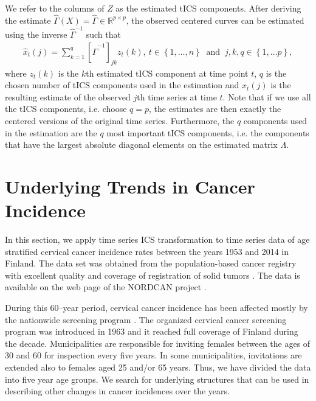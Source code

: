 \documentclass{llncs}
\begin{document}
We refer to the columns of $Z$ as the estimated tICS components. After deriving the estimate $\hat{\Gamma}\left(X\right) = \hat{\Gamma}\in \mathbb{R}^{p\times p}$,  the observed centered curves can be  estimated using the inverse $\hat{\Gamma}^{-1}$ such that
\begin{align}
\label{estimation}
\hat{x}_t\left(j\right)= \sum_{k=1}^q  \left[\hat{\Gamma}^{-1}\right]_{jk} z_t\left(k\right) , \ t\in \left\{1,\ldots, n\right\}  \ \text{ and  } \ j,k,q \in \left\{1,\ldots p\right\},
\end{align}
where $z_t\left(k\right)$ is the $k$th estimated tICS component at time point $t$, $q$ is the chosen number of tICS components used in the estimation and $\hat{x}_t\left(j\right)$ is the resulting estimate of the observed $j$th time series at  time $t$.  Note that if we use all the tICS components, i.e. choose $q=p$, the estimates are then exactly the centered versions of the original time series. Furthermore, the $q$ components used in the estimation are the $q$ most important tICS components, i.e. the components that have the   largest absolute  diagonal elements on the estimated  matrix $\Lambda$. 


\section{Underlying Trends in Cancer Incidence}\label{data}
In this section, we apply time series ICS transformation to time series data of age stratified cervical cancer incidence rates between the years 1953 and 2014 in Finland.
The data set was obtained from the population-based cancer registry with excellent quality and coverage of registration of solid tumors \cite{leinonen2016,teppo1994}. The data is available on  the web page of the NORDCAN project \cite{engholm2010}.

During this 60--year period, cervical cancer incidence has been affected mostly by the nationwide screening program \cite{hakama1975}. The organized cervical cancer screening program was introduced in 1963 and it reached full coverage of Finland during the decade. Municipalities are responsible for inviting females between the ages of 30 and 60 for inspection every five years. In some municipalities, invitations are extended also to females aged 25 and/or 65 years. Thus, we have divided the data into five year age groups.  We  search for underlying structures that can be used in describing other changes in cancer incidences over the years. 
 
\end{document}

